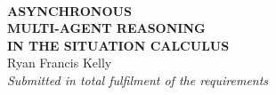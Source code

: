 %
%







\begin{titlepage}
\begin{center}
%
%
%
%
\ \\
\vspace{1cm}
{\bf\LARGE  ASYNCHRONOUS }\\ \vspace{0.5cm}
{\bf\LARGE  MULTI-AGENT REASONING }\\ \vspace{0.5cm}
{\bf\LARGE  IN THE SITUATION CALCULUS } \\
\vspace{3cm}
{\LARGE      Ryan Francis Kelly       }\\
\vspace{5cm}
{\em\large Submitted in total fulfilment of the requirements}\\ \vspace{0.1cm}

\end{center}
\end{titlepage}

